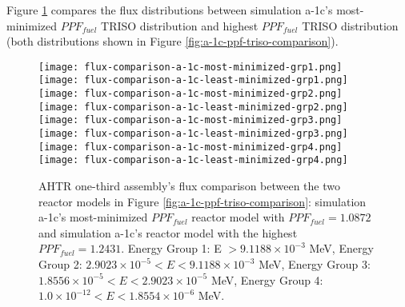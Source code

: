 Figure \ref{fig:a-1c-flux-comparison} compares the flux distributions between 
simulation a-1c's most-minimized $PPF_{fuel}$ TRISO distribution and highest 
$PPF_{fuel}$ TRISO distribution (both distributions shown in Figure 
\ref{fig:a-1c-ppf-triso-comparison}). 
\begin{figure}[htbp!]
    \centering
    \texttt{[image: flux-comparison-a-1c-most-minimized-grp1.png]} 
    \texttt{[image: flux-comparison-a-1c-least-minimized-grp1.png]} 
    \texttt{[image: flux-comparison-a-1c-most-minimized-grp2.png]} 
    \texttt{[image: flux-comparison-a-1c-least-minimized-grp2.png]} 
    \texttt{[image: flux-comparison-a-1c-most-minimized-grp3.png]} 
    \texttt{[image: flux-comparison-a-1c-least-minimized-grp3.png]} 
    \texttt{[image: flux-comparison-a-1c-most-minimized-grp4.png]} 
    \texttt{[image: flux-comparison-a-1c-least-minimized-grp4.png]} 
    \caption{AHTR one-third assembly's flux comparison between the two reactor models 
    in Figure \ref{fig:a-1c-ppf-triso-comparison}: simulation a-1c's most-minimized 
    $PPF_{fuel}$ reactor model with $PPF_{fuel} = 1.0872$ and simulation a-1c's reactor 
    model with the highest $PPF_{fuel} = 1.2431$.
    Energy Group 1: E $> 9.1188 \times 10^{-3}$ MeV, 
    Energy Group 2: $2.9023 \times 10^{-5} < E < 9.1188 \times 10^{-3}$ MeV,
    Energy Group 3:  $1.8556 \times 10^{-5} < E < 2.9023 \times 10^{-5}$ MeV,
    Energy Group 4:  $1.0 \times 10^{-12} < E < 1.8554 \times 10^{-6}$ MeV.}
    \label{fig:a-1c-flux-comparison}
\end{figure}


